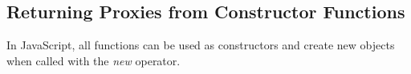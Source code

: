 









\subsection{Returning Proxies from Constructor Functions} 

In JavaScript, all functions can be used as constructors and create new objects when called with the \emph{new} operator.





